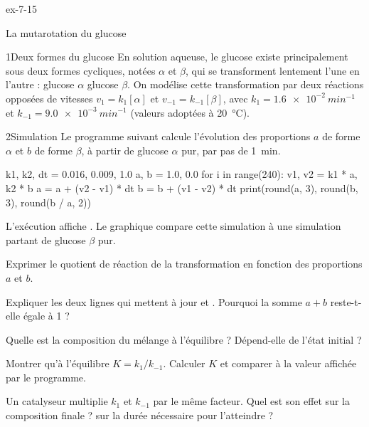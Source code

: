 \begin{blocLivre}{ex-7-15}
\begin{exercice}[3]{La mutarotation du glucose}
\begin{docu}{1}{Deux formes du glucose}
En solution aqueuse, le glucose existe principalement sous deux formes cycliques, notées $\alpha$ et $\beta$, qui se
transforment lentement l'une en l'autre : glucose $\alpha$ \ce{<=>} glucose $\beta$. On modélise cette transformation
par deux réactions opposées de vitesses $v_1=k_1[\alpha]$ et $v_{-1}=k_{-1}[\beta]$, avec $k_1=\qty{1,6e-2}{min^{-1}}$ et
$k_{-1}=\qty{9,0e-3}{min^{-1}}$ (valeurs adoptées à 20~°C).
\end{docu}
\begin{docu}{2}{Simulation}
Le programme suivant calcule l'évolution des proportions $a$ de forme $\alpha$ et $b$ de forme $\beta$, à partir de
glucose $\alpha$ pur, par pas de 1~min.
\begin{python}
k1, k2, dt = 0.016, 0.009, 1.0
a, b = 1.0, 0.0
for i in range(240):
    v1, v2 = k1 * a, k2 * b
    a = a + (v2 - v1) * dt
    b = b + (v1 - v2) * dt
print(round(a, 3), round(b, 3), round(b / a, 2))
\end{python}
L'exécution affiche . Le graphique compare cette simulation à une simulation partant de
glucose $\beta$ pur.
\end{docu}
\begin{questions}
\item Exprimer le quotient de réaction de la transformation en fonction des proportions $a$ et $b$.
\item {}Expliquer les deux lignes qui mettent à jour  et . Pourquoi la somme
$a+b$ reste-t-elle égale à 1 ?
\item Quelle est la composition du mélange à l'équilibre ? Dépend-elle de l'état initial ?
\item Montrer qu'à l'équilibre $K=k_1/k_{-1}$. Calculer $K$ et comparer à la valeur affichée par le programme.
\item \initiative Un catalyseur multiplie $k_1$ et $k_{-1}$ par le même facteur. Quel est son effet sur la composition
finale ? sur la durée nécessaire pour l'atteindre ?
\end{questions}
\end{exercice}
\end{blocLivre}
